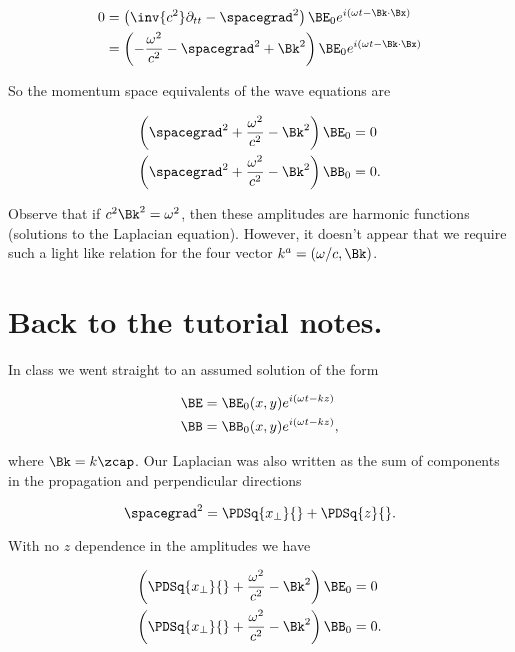 \begin{align*}
0 &=
\left(\inv{c^2} \partial_{tt} - \spacegrad^2 \right) \BE_0 e^{i (\omega t - \Bk \cdot \Bx)} \\
&=
\left(-\frac{\omega^2}{c^2} - \spacegrad^2 + \Bk^2 \right) \BE_0 e^{i (\omega t - \Bk \cdot \Bx)}
\end{align*}

So the momentum space equivalents of the wave equations are

\begin{align}\label{eqn:relativisticElectrodynamicsT4:170}
\left( \spacegrad^2 +\frac{\omega^2}{c^2} - \Bk^2 \right) \BE_0 &= 0 \\
\left( \spacegrad^2 +\frac{\omega^2}{c^2} - \Bk^2 \right) \BB_0 &= 0.
\end{align}

Observe that if $c^2 \Bk^2 = \omega^2$, then these amplitudes are harmonic functions (solutions to the Laplacian equation).  However, it doesn't appear that we require such a light like relation for the four vector $k^a = (\omega/c, \Bk)$.

\section{Back to the tutorial notes.}

In class we went straight to an assumed solution of the form

\begin{align}\label{eqn:relativisticElectrodynamicsT4:190}
\BE &= \BE_0(x, y) e^{ i(\omega t - k z) } \\
\BB &= \BB_0(x, y) e^{ i(\omega t - k z) },
\end{align}

where $\Bk = k \zcap$.  Our Laplacian was also written as the sum of components in the propagation and perpendicular directions

\begin{equation}\label{eqn:relativisticElectrodynamicsT4:210}
\spacegrad^2 = \PDSq{x_\perp}{} + \PDSq{z}{}.
\end{equation}

With no $z$ dependence in the amplitudes we have

\begin{align}\label{eqn:relativisticElectrodynamicsT4:170}
\left( \PDSq{x_\perp}{} +\frac{\omega^2}{c^2} - \Bk^2 \right) \BE_0 &= 0 \\
\left( \PDSq{x_\perp}{} +\frac{\omega^2}{c^2} - \Bk^2 \right) \BB_0 &= 0.
\end{align}

